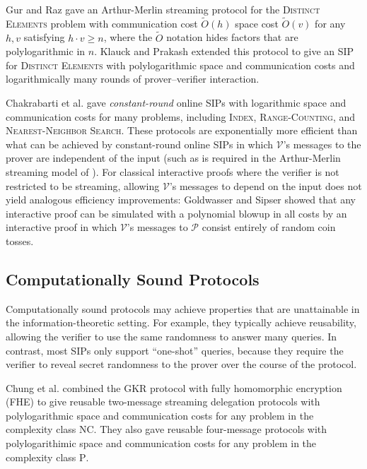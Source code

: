 \documentclass[11pt, letterpaper]{article}
\newcommand{\cV}{\mathcal{V}}
\newcommand{\cP}{\mathcal{P}}
\begin{document}
Gur and Raz \cite{gur} gave an Arthur-Merlin streaming protocol for the \textsc{Distinct Elements} problem 
with communication cost $\tilde{O}(h)$ space cost $\tilde{O}(v)$ for any $h, v$ satisfying $h \cdot v \geq n$, where the $\tilde{O}$ notation hides factors that are polylogarithmic in $n$. Klauck and Prakash \cite{prakashnew}
extended this protocol to give an SIP for \textsc{Distinct Elements} with polylogarithmic space and communication costs and logarithmically
many rounds of prover--verifier interaction. 

Chakrabarti et al. \cite{suresh} gave \emph{constant-round} online SIPs with logarithmic space and communication costs for many problems, including \textsc{Index}, \textsc{Range-Counting}, and \textsc{Nearest-Neighbor Search}. These protocols are exponentially more efficient than what can be achieved by constant-round online SIPs in which $\cV$'s messages to the prover are independent of the input (such as is required in the Arthur-Merlin streaming model of \cite{gur}). 
For classical interactive proofs where the verifier is not restricted to be streaming, allowing $\cV$'s messages to depend on the input does not yield analogous efficiency improvements: Goldwasser and Sipser \cite{goldwassersipser} showed that any interactive proof can be simulated with a polynomial blowup in all costs by an interactive proof in which $\cV$'s messages to $\cP$ consist entirely of random coin tosses.  





 
\subsection{Computationally Sound Protocols}
\label{sec:cs}
Computationally sound protocols may achieve properties that are unattainable in the information-theoretic setting. For example, they
typically achieve reusability, allowing the verifier to use the same randomness to answer many queries. In
contrast, most SIPs only support ``one-shot'' queries, because they require the verifier to reveal secret
randomness to the prover over the course of the protocol.

Chung et al. \cite{chung} combined the GKR protocol with fully homomorphic encryption (FHE) to give reusable
two-message streaming delegation protocols with polylogarithmic space and communication costs for any problem in the complexity class \textsc{NC}. They
 also gave reusable four-message protocols with polylogarithimic space and communication costs for any problem in the complexity class \textsc{P}. 
 
\end{document}
